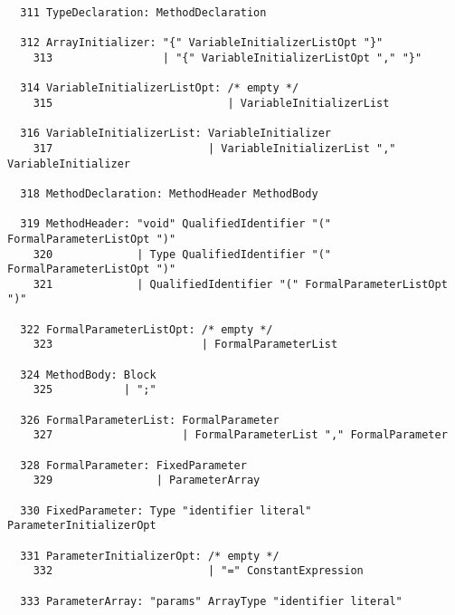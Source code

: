 \begin{espacosimples}
\begin{scriptsize}
\begin{lstlisting}
  311 TypeDeclaration: MethodDeclaration
  
  312 ArrayInitializer: "{" VariableInitializerListOpt "}"
    313                 | "{" VariableInitializerListOpt "," "}"
  
  314 VariableInitializerListOpt: /* empty */
    315                           | VariableInitializerList
  
  316 VariableInitializerList: VariableInitializer
    317                        | VariableInitializerList "," VariableInitializer
  
  318 MethodDeclaration: MethodHeader MethodBody
  
  319 MethodHeader: "void" QualifiedIdentifier "(" FormalParameterListOpt ")"
    320             | Type QualifiedIdentifier "(" FormalParameterListOpt ")"
    321             | QualifiedIdentifier "(" FormalParameterListOpt ")"
  
  322 FormalParameterListOpt: /* empty */
    323                       | FormalParameterList
  
  324 MethodBody: Block
    325           | ";"
  
  326 FormalParameterList: FormalParameter
    327                    | FormalParameterList "," FormalParameter
  
  328 FormalParameter: FixedParameter
    329                | ParameterArray
  
  330 FixedParameter: Type "identifier literal" ParameterInitializerOpt
  
  331 ParameterInitializerOpt: /* empty */
    332                        | "=" ConstantExpression
  
  333 ParameterArray: "params" ArrayType "identifier literal"
  

\end{lstlisting}\end{scriptsize}\end{espacosimples}
